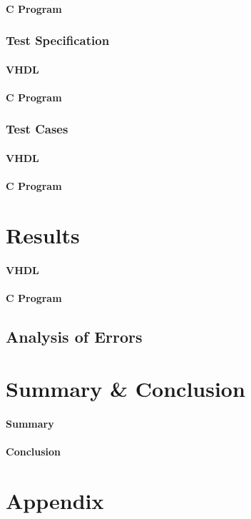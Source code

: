 \documentclass{article}
\begin{document}
    \paragraph{C Program}

    \subsubsection{Test Specification}
    \paragraph{VHDL}
    \paragraph{C Program}

    \subsubsection{Test Cases}
    \paragraph{VHDL}
    \paragraph{C Program}



\section{Results}
  \paragraph{VHDL}
  \paragraph{C Program}
  
  \subsection{Analysis of Errors}


\section{Summary \& Conclusion}
  \paragraph{Summary}
  \paragraph{Conclusion}


\section{Appendix}
\end{document}
